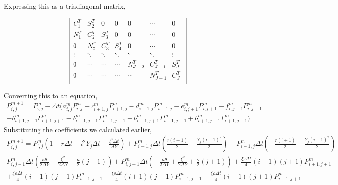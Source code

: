 \documentclass{article}
\begin{document}
\begin{enumerate}
Expressing this as a triadiagonal matrix,

\[\begin{bmatrix}
C_1^T & S_2^T & 0 & 0 &0&\cdots&0 \\
N_1^T & C_2^T & S_3^T & 0 &0&\cdots&0 \\
0 & N_2^T & C_3^T & S_4^T &0&\cdots&0 \\
\vdots & \ddots & \ddots & \ddots & \ddots&\ddots&\vdots \\
0&\cdots&\cdots&\cdots&N^T_{J-2}&C^T_{J-1}&S^T_{J}\\
0&\cdots&\cdots&\cdots&\cdots&N^T_{J-1}&C^T_{J}\\
\end{bmatrix}\] 

Converting this to an equation,
\begin{align*}
P^{m+1}_{i,j} = P^m_{i,j} - \Delta{t}(a^m_{i,j}P^m_{i,j} - c^m_{i+1,j}P^m_{i+1,j} - d^m_{i-1,j}P^m_{i-1,j} - e^m_{i,j+1}P^m_{i,j+1} - f^m_{i,j-1}P^m_{i,j-1} \\
-b^m_{i+1,j+1}P^m_{i+1,j+1}-b^m_{i-1,j-1}P^m_{i-1,j-1}+b^m_{i-1,j+1}P^m_{i-1,j+1}+b^m_{i+1,j-1}P^m_{i+1,j-1})
\end{align*}
Substituting the coefficients we calculated earlier, 
\begin{align*}
P^{m+1}_{i,j} = P^{m}_{i,j}(1 - r\Delta{t} - i^2Y_j\Delta{t} - \frac{\xi^2\Delta{t}}{\Delta{Y}} ) + P^{m}_{i-1,j}\Delta{t}(\frac{r(i-1)}{2} +\frac{Y_j(i-1)^2}{2}) + P^{m}_{i+1,j}\Delta{t}(-\frac{r(i+1)}{2} +\frac{Y_j(i+1)^2}{2})\\
P^m_{i,j-1}\Delta{t}(\frac{\kappa\theta}{2\Delta{Y}} + \frac{\xi^2}{2\Delta{Y}} - \frac{\kappa}{2}(j-1)) + P^m_{i,j+1}\Delta{t}(-\frac{\kappa\theta}{2\Delta{Y}} + \frac{\xi^2}{2\Delta{Y}} + \frac{\kappa}{2}(j+1)) +\frac{\xi\rho\Delta{t}}{4}(i+1)(j+1)P^m_{i+1,j+1} \\
+\frac{\xi\rho\Delta{t}}{4}(i-1)(j-1)P^m_{i-1,j-1} -\frac{\xi\rho\Delta{t}}{4}(i+1)(j-1)P^m_{i+1,j-1} -\frac{\xi\rho\Delta{t}}{4}(i-1)(j+1)P^m_{i-1,j+1}
\end{align*}


\end{enumerate}
\end{document}
